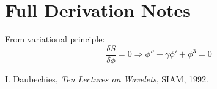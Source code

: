 \documentclass[12pt]{article}
\begin{document}
\section{Full Derivation Notes}
From variational principle:
\begin{equation}
\frac{\delta S}{\delta \phi} = 0 \Rightarrow \phi'' + \gamma \phi' + \phi^3 = 0
\end{equation}

\begin{thebibliography}{9}
 I. Daubechies, \textit{Ten Lectures on Wavelets}, SIAM, 1992.
\end{thebibliography}
\end{document}
